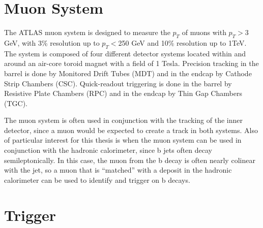 
\section{Muon System}
The ATLAS muon system is designed to measure the $p_T$ of muons with $p_T>$3 GeV, with 3\% resolution up to $p_T<$250 GeV and 10\% resolution up to 1TeV.  The system is composed of four different detector systems located within and around an air-core toroid magnet with a field of 1 Tesla.  Precision tracking in the barrel is done by Monitored Drift Tubes (MDT) and in the endcap by Cathode Strip Chambers (CSC).  Quick-readout triggering is done in the barrel by Resistive Plate Chambers (RPC) and in the endcap by Thin Gap Chambers (TGC).  

The muon system is often used in conjunction with the tracking of the inner detector, since a muon would be expected to create a track in both systems.  Also of particular interest for this thesis is when the muon system can be used in conjunction with the hadronic calorimeter, since b jets often decay semileptonically.  In this case, the muon from the b decay is often nearly colinear with the jet, so a muon that is ``matched'' with a deposit in the hadronic calorimeter can be used to identify and trigger on b decays.  






\section{Trigger}

